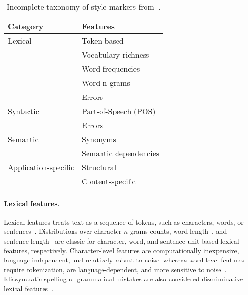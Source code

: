 \begin{table}[h]
    \centering
    \caption{Incomplete taxonomy of style markers from~\citep{stamatatos_survey_2009}.}
    \label{tab:stylometric_features}
 
    \begin{tabular}{@{}ll@{}} %
    \toprule
    \textbf{Category} & \textbf{Features} \\ 
    \midrule
    Lexical & Token-based \\ %
     & Vocabulary richness  \\
     & Word frequencies  \\
     & Word n-grams  \\
     & Errors \\
    Syntactic & Part-of-Speech (POS)  \\
     & Errors  \\
    Semantic & Synonyms \\
     & Semantic dependencies \\
    Application-specific & Structural  \\
     & Content-specific\\
     \bottomrule
    \end{tabular}%

\end{table}

\paragraph{Lexical features.} 
Lexical features treats text as a sequence of tokens, such as characters, words, or sentences~\citep{stamatatos_survey_2009}. 
Distributions over character $n$-grams counts, word-length~\citep{stein_intrinsic_2011}, and sentence-length~\citep{stein_intrinsic_2011,abbasi_writeprints_2008} are classic for character, word, and sentence unit-based lexical features, respectively. 
Character-level features are computationally inexpensive, language-independent, and relatively robust to noise, whereas word-level features require tokenization, are language-dependent, and more sensitive to noise~\citep{stamatatos_survey_2009}.
Idiosyncratic spelling or grammatical mistakes are also considered discriminative lexical features~\citep{abbasi_writeprints_2008,neal_surveying_2018}. 

